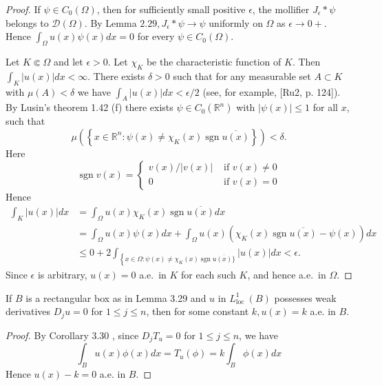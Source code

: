 \begin{proof}
  If $\psi \in C_0(\Omega)$, then for sufficiently small positive $\epsilon$, the mollifier $J_\epsilon * \psi$ belongs to $\mathscr{D}(\Omega)$. By Lemma $2.29, J_\epsilon * \psi \rightarrow \psi$ uniformly on $\Omega$ as $\epsilon \rightarrow 0+$. Hence $\int_{\Omega} u(x) \psi(x) d x=0$ for every $\psi \in C_0(\Omega)$.
  
  Let $K \Subset \Omega$ and let $\epsilon>0$. Let $\chi_K$ be the characteristic function of $K$. Then $\int_K|u(x)| d x<\infty$. There exists $\delta>0$ such that for any measurable set $A \subset K$ with $\mu(A)<\delta$ we have $\int_A|u(x)| d x<\epsilon / 2$ (see, for example, [Ru2, p. 124]). By Lusin's theorem 1.42 (f) there exists $\psi \in C_0\left(\mathbb{R}^n\right)$ with $|\psi(x)| \leq 1$ for all $x$, such that
  \[
  \mu\left(\left\{x \in \mathbb{R}^n: \psi(x) \neq \chi_K(x) \operatorname{sgn} \overline{u(x)}\right\}\right)<\delta .
  \]
  Here
  \[
  \operatorname{sgn} v(x)= \begin{cases}v(x) /|v(x)| & \text { if } v(x) \neq 0 \\ 0 & \text { if } v(x)=0\end{cases}
  \]
  Hence
  \[
  \begin{aligned}
  \int_K|u(x)| d x & =\int_{\Omega} u(x) \chi_K(x) \operatorname{sgn} \overline{u(x)} d x \\
  & =\int_{\Omega} u(x) \psi(x) d x+\int_{\Omega} u(x)\left(\chi_K(x) \operatorname{sgn} \overline{u(x)}-\psi(x)\right) d x \\
  & \leq 0+2 \int_{\left\{x \in \Omega: \psi(x) \neq \chi_K(x) \operatorname{sgn} \overline{u(x)\}}\right.}|u(x)| d x<\epsilon .
  \end{aligned}
  \]
  Since $\epsilon$ is arbitrary, $u(x)=0$ a.e.~in $K$ for each such $K$,
  and hence a.e.~in $\Omega$.
\end{proof}


\begin{corollary}
  If $B$ is a rectangular box as in Lemma 3.29 and $u$ in $L_{\text {loc }}^1(B)$ possesses weak derivatives $D_j u=0$ for $1 \leq j \leq n$, then for some constant $k, u(x)=k$ a.e. in $B$.
\end{corollary}

\begin{proof}
  By Corollary 3.30 , since $D_j T_u=0$ for $1 \leq j \leq n$, we have
  \[
  \int_B u(x) \phi(x) d x=T_u(\phi)=k \int_B \phi(x) d x
  \]
  Hence $u(x)-k=0$ a.e. in $B$.
\end{proof}


